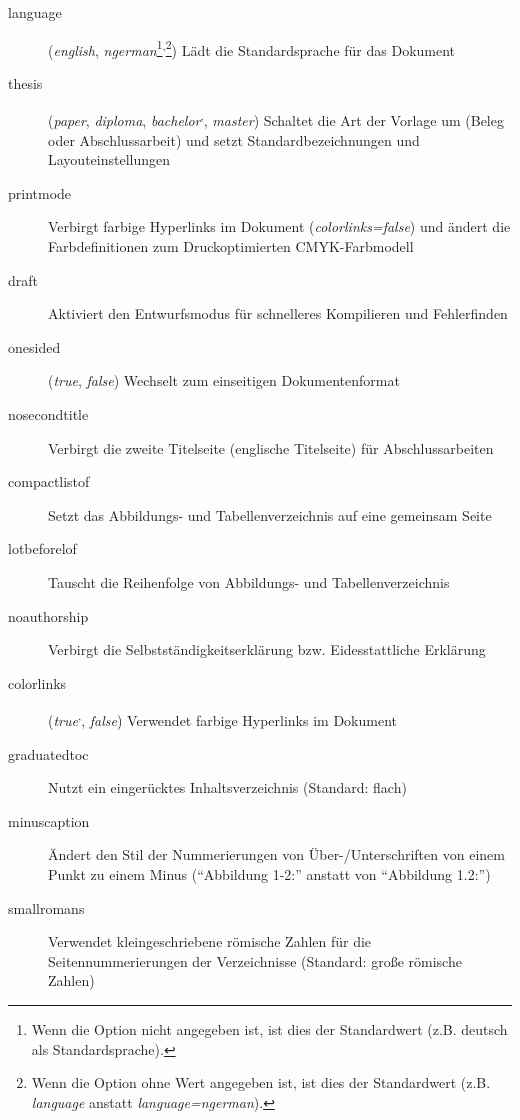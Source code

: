 \documentclass[
%
	thesis=paper,		%
	compactlistof,		%
	noauthorship,		%
%
	fancy,				%
%
%
]{hsmw-thesis}
\begin{document}
	\begin{description}
		\item[language] (\textit{english}, \textit{ngerman}\footnote{\label{ftn:optionDefault}Wenn die Option nicht angegeben ist, ist dies der Standardwert (z.B. deutsch als Standardsprache).}\textsuperscript{,}\footnote{\label{ftn:optionDefaultValue}Wenn die Option ohne Wert angegeben ist, ist dies der Standardwert (z.B. \textit{language} anstatt \textit{language=ngerman}).}) Lädt die Standardsprache für das Dokument
		\item[thesis] (\textit{paper}, \textit{diploma}, \textit{bachelor}\textsuperscript{,}, \textit{master}) Schaltet die Art der Vorlage um (Beleg oder Abschlussarbeit) und setzt Standardbezeichnungen und Layouteinstellungen
		\item[printmode] Verbirgt farbige Hyperlinks im Dokument (\textit{colorlinks=false}) und ändert die Farbdefinitionen zum Druckoptimierten CMYK-Farbmodell
		\item[draft] Aktiviert den Entwurfsmodus für schnelleres Kompilieren und Fehlerfinden
		\item[onesided] (\textit{true}, \textit{false}) Wechselt zum einseitigen Dokumentenformat
		\item[nosecondtitle] Verbirgt die zweite Titelseite (englische Titelseite) für Abschlussarbeiten
		\item[compactlistof] Setzt das Abbildungs- und Tabellenverzeichnis auf eine gemeinsam Seite
		\item[lotbeforelof] Tauscht die Reihenfolge von Abbildungs- und Tabellenverzeichnis
		\item[noauthorship] Verbirgt die Selbstständigkeitserklärung bzw. Eidesstattliche Erklärung
		\item[colorlinks] (\textit{true}\textsuperscript{,}, \textit{false}) Verwendet farbige Hyperlinks im Dokument
		\item[graduatedtoc] Nutzt ein eingerücktes Inhaltsverzeichnis (Standard: flach)
		\item[minuscaption] Ändert den Stil der Nummerierungen von Über-/Unterschriften von einem Punkt zu einem Minus (\enquote{Abbildung 1-2:} anstatt von \enquote{Abbildung 1.2:})
		\item[smallromans] Verwendet kleingeschriebene römische Zahlen für die Seitennummerierungen der Verzeichnisse (Standard: große römische Zahlen)

\end{description}
\end{document}
